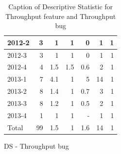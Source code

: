 \documentclass[UKenglish]{ifimaster}  %
\begin{document}
\begin{appendices}
\begin{table}[!htbp]
\begin{adjustwidth}{-2.5cm}{}
\begin{subfigure}[b]{0.3\textwidth}
{\begin{tabular}{ | l | r | r | r | r | r | r | }
 2012-2  & 3 & 1 & 1 & 0 &1 & 1 \\ \hline
 2012-3  & 3 & 1 & 1 & 0 &1 & 1 \\ \hline
 2012-4  & 4 & 1.5 & 1.5 & 0.6 & 2 & 1 \\ \hline
 2013-1  & 7 & 4.1 & 1 & 5 & 14 & 1 \\ \hline
 2013-2  & 8 & 1.4 & 1 & 0.7 & 3 & 1 \\ \hline
 2013-3  & 8 & 1.2 & 1 & 0.5 & 2 & 1 \\ \hline
 2013-4  & 1 & 1 & 1 & - & 1 & 1 \\ \hline
 Total  & 99 & 1.5 & 1 & 1.6 & 14 & 1 \\ \hline
\end{tabular}
}
\caption{DS - Throughput bug}
 \label{DS:TPB:8}
\end{subfigure}
\end{adjustwidth}
\caption[Optional caption for list of figures]{Caption of Descriptive Statistic for Throughput feature and Throughput bug}
\label{DS:8:2}
\end{table}




\end{appendices}
\end{document}
